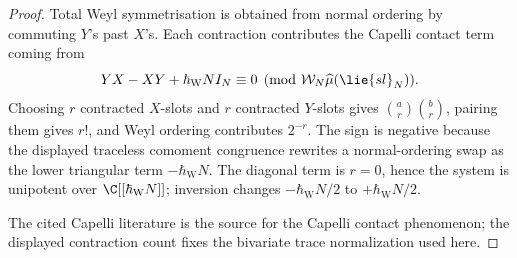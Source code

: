 \begin{proof}
  Total Weyl symmetrisation is obtained from normal ordering by
  commuting \(Y\)'s past \(X\)'s.  Each contraction contributes the
  Capelli contact term coming from
  \[
    YX-XY+\hbar_{\mathrm{W}} N I_N\equiv0
      \pmod{\mathcal W_N\widehat\mu(\lie{sl}_N)}.
  \]
  Choosing \(r\) contracted \(X\)-slots and \(r\) contracted \(Y\)-slots
  gives \(\binom ar\binom br\), pairing them gives \(r!\), and Weyl
  ordering contributes \(2^{-r}\).  The sign is negative because the
  displayed traceless comoment congruence rewrites a normal-ordering swap as the
  lower triangular term \(-\hbar_{\mathrm{W}} N\).  The diagonal term is \(r=0\),
  hence the system is unipotent over \(\C[[\hbar_{\mathrm{W}} N]]\); inversion
  changes \(-\hbar_{\mathrm{W}} N/2\) to \(+\hbar_{\mathrm{W}} N/2\).

  The cited Capelli literature is the source for the
  Capelli contact phenomenon; the displayed contraction count fixes
  the bivariate trace normalization used here.
\end{proof}

